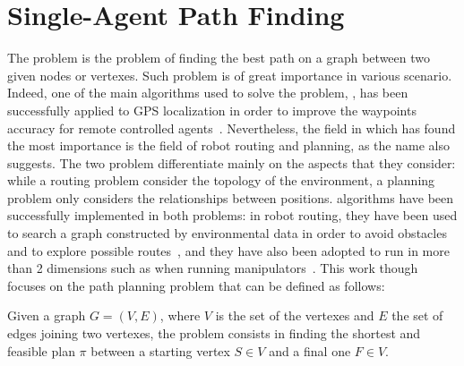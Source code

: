 \section{Single-Agent Path Finding}
\label{sec:SAPF}
The  problem is the problem of finding the best path on a graph 
between two given nodes or vertexes. Such problem is of great importance in 
various scenario. Indeed, one of the main algorithms used to solve the 
 problem, \astar, has been successfully applied to GPS localization
in order to improve the waypoints accuracy for remote controlled 
agents~\cite{astar_gps}. Nevertheless, the field in which  has found
the most importance is the field of robot routing and planning, as the name 
also suggests. The two problem differentiate mainly on the aspects that they 
consider: while a routing problem consider the topology of the environment, a 
planning problem only considers the relationships between positions. 
 algorithms have been successfully implemented in both problems: 
in robot routing, they have been used to search a graph constructed by 
environmental data in order to avoid obstacles and to explore possible 
routes~\cite{robot_routing}, and they have also been adopted to run in more 
than 2 dimensions such as when running manipulators~\cite{robot_mani}. \newline
This work though focuses on the path planning problem that can be defined as 
follows:
\begin{definition}
Given a graph $G = (V,E)$, where $V$ is the set of the vertexes and $E$ the set
of edges joining two vertexes, the  problem consists in finding the
shortest and feasible plan $\pi$ between a starting vertex $S\in V$ and a final 
one $F\in V$.
\end{definition}

